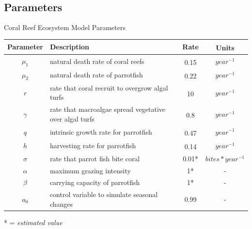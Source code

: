\documentclass{beamer}
\begin{document}
\subsection{Parameters}
\begin{frame}{Coral Reef Ecosystem Model Parameters}
    \begin{table}
    \vspace{-.7cm}
    \begin{tabular}{c p{5cm} c c}
        \hline
        Parameter & Description & Rate & Units\textsuperscript{\cite{12_noaa_report}\cite{04_mathanalysis}\cite{13_blackwood_hastings_mumby_2010}}\\
        \hline
        \hline
        $\mu_{1}$ & natural death rate of coral reefs & 0.15\textsuperscript{\cite{16_wolanski_richmond_mccook_2004}} & $year^{-1}$\\ %
        $\mu_{2}$ & natural death rate of parrotfish & 0.22\textsuperscript{\cite{12_noaa_report}} & $year^{-1}$\\ %
        $r$ & rate that coral recruit to overgrow algal turfs & 10\textsuperscript{\cite{16_wolanski_richmond_mccook_2004}} & $year^{-1}$\\ %
        $\gamma$ & rate that macroalgae spread vegetative over algal turfs & 0.8\textsuperscript{\cite{11_zikkah_anggriani_supriatna_2020}} & $year^{-1}$\\ %
        $q$ & intrinsic growth rate for parrotfish & 0.47\textsuperscript{\cite{12_noaa_report}} & $year^{-1}$\\ %
        $h$ & harvesting rate for parrotfish & 0.14\textsuperscript{\cite{12_noaa_report}} & $year^{-1}$\\ %
        $\sigma$ & rate that parrot fish bite coral & 0.01*& $bites*year^{-1}$\\
        $\alpha$ & maximum grazing intensity & 1* & -\\
        $\beta$ & carrying capacity of parrotfish & 1* & -\\
        $a_{0}$ & control variable to simulate seasonal changes & 0.99 & - %
    \end{tabular}
\end{table}
* = \textit{estimated value}
\end{frame}
\end{document}
